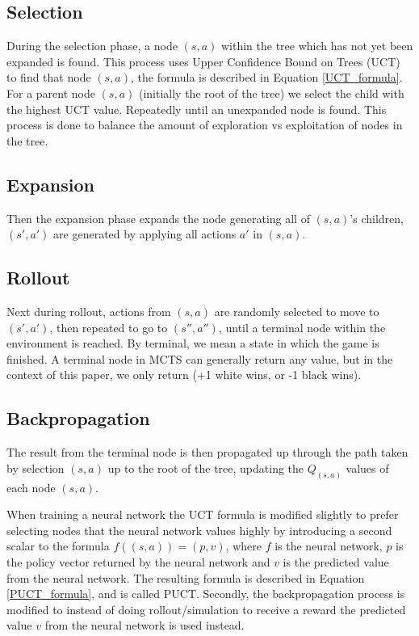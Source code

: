 \subsection*{Selection}
During the selection phase, a node $(s,a)$ within the tree which has not yet been expanded is found.
This process uses Upper Confidence Bound on Trees (UCT) to find that node $(s,a)$, the formula is described in Equation \ref{UCT_formula}. For a parent node $(s,a)$
(initially the root of the tree) we select the child with the highest UCT value. Repeatedly until an unexpanded
node is found. This process is done to balance the amount of exploration vs exploitation of nodes in the
tree.

\subsection*{Expansion}
Then the expansion phase expands the node generating all of $(s,a)$'s children, $(s',a')$ are generated by applying all actions $a'$ in $(s,a)$.

\subsection*{Rollout}
Next during rollout, actions from $(s,a)$ are randomly selected to move to $(s',a')$, then repeated to go to $(s'',a'')$, until a terminal node within the environment is reached. By terminal, we mean a state in which the game is finished. A terminal node in MCTS can generally return any value, but in the context of this paper, we only return (+1 white wins, or -1 black wins).


\subsection*{Backpropagation}
The result from the terminal node is then propagated up through the path taken by selection $(s,a)$ up
to the root of the tree, updating the $Q_{(s,a)}$ values of each node $(s,a)$.

When training a neural network the UCT formula is modified slightly to prefer selecting nodes
that the neural network values highly by introducing a second scalar to the formula $f((s,a)) = (p,v)$, where $f$ is the neural network, $p$ is the policy vector returned by the neural network and $v$ is the predicted value from the neural network. The resulting formula is described in Equation \ref{PUCT_formula}, and is called PUCT. Secondly, the backpropagation process
is modified to instead of doing rollout/simulation to receive a reward the predicted value $v$ from the neural network is used instead.

